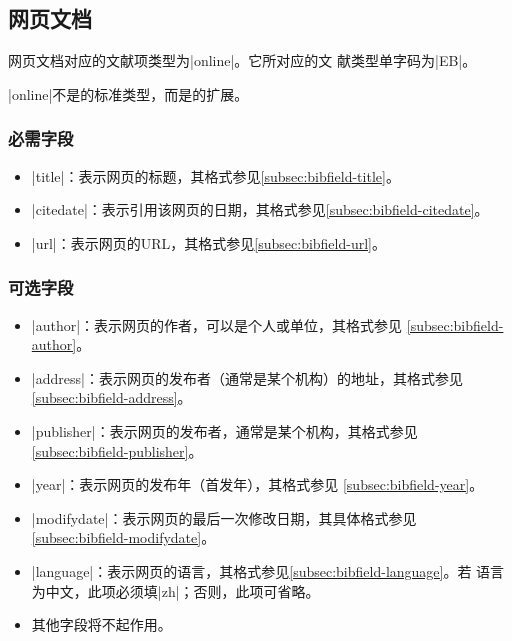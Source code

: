 

\subsection{网页文档}\label{subsec:bibtype-online}

网页文档对应的{\BibTeX}文献项类型为|online|。它所对应的文
献类型\cite{gbt3469-1983}单字码为|EB|。

|online|不是{\BibTeX}的标准类型，而是{\njuthesis}的扩展。

\subsubsection{必需字段}

\begin{itemize}
\item |title|：表示网页的标题，其格式参见\ref{subsec:bibfield-title}。
\item |citedate|：表示引用该网页的日期，其格式参见\ref{subsec:bibfield-citedate}。
\item |url|：表示网页的URL，其格式参见\ref{subsec:bibfield-url}。
\end{itemize}

\subsubsection{可选字段}

\begin{itemize}
\item |author|：表示网页的作者，可以是个人或单位，其格式参见
  \ref{subsec:bibfield-author}。
\item |address|：表示网页的发布者（通常是某个机构）的地址，其格式参见
  \ref{subsec:bibfield-address}。
\item |publisher|：表示网页的发布者，通常是某个机构，其格式参见
  \ref{subsec:bibfield-publisher}。
\item |year|：表示网页的发布年（首发年），其格式参见
  \ref{subsec:bibfield-year}。
\item |modifydate|：表示网页的最后一次修改日期，其具体格式参见
  \ref{subsec:bibfield-modifydate}。
\item |language|：表示网页的语言，其格式参见\ref{subsec:bibfield-language}。若
  语言为中文，此项必须填|zh|；否则，此项可省略。
\item 其他字段将不起作用。
\end{itemize}

